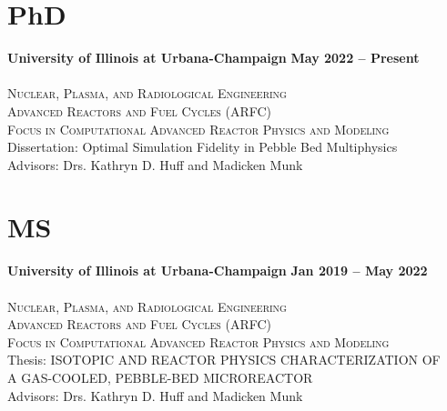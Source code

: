

\section{\mysidestyle PhD}
\textbf{University of Illinois at Urbana-Champaign} \hfill \textbf{May 2022 -- Present}\vspace{-3mm}\\\vspace{-1mm}\\
\textsc{Nuclear, Plasma, and Radiological Engineering \\ Advanced Reactors and Fuel Cycles (ARFC) \\ Focus in Computational Advanced Reactor Physics and Modeling}\hfill \\
\hspace*{2mm} Dissertation: Optimal Simulation Fidelity in Pebble Bed Multiphysics \\
\hspace*{2mm} Advisors:  Drs. Kathryn D. Huff and Madicken Munk

\section{\mysidestyle MS}
\textbf{University of Illinois at Urbana-Champaign} \hfill \textbf{Jan 2019 -- May 2022}\vspace{-3mm}\\\vspace{-1mm}\\
\textsc{Nuclear, Plasma, and Radiological Engineering \\ Advanced Reactors and Fuel Cycles (ARFC) \\ Focus in Computational Advanced Reactor Physics and Modeling}\hfill \\
\hspace*{2mm} Thesis: ISOTOPIC AND REACTOR PHYSICS CHARACTERIZATION OF \\
\hspace*{2mm} A GAS-COOLED, PEBBLE-BED MICROREACTOR \\
\hspace*{2mm} Advisors:  Drs. Kathryn D. Huff and Madicken Munk

